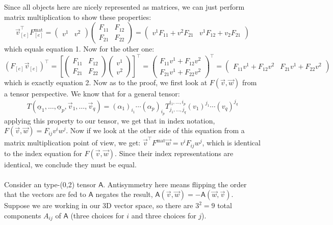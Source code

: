 \documentclass{article}
\begin{document}
\begin{solution}
	Since all objects here are nicely represented as matrices, we can just perform matrix multiplication to 
	show these properties:
	\[
		\vec v_{[e]}^\top F_{[e]}^\text{mat} = \begin{pmatrix} v^1 & v^2 \end{pmatrix} 
		\begin{pmatrix} F_{11} & F_{12}\\F_{21}& F_{22} \end{pmatrix} = \begin{pmatrix} v^1F_{11} + v^2F_{21} & 
	v^1F_{12} + v_2F_{21} \end{pmatrix}
	\]
	which equals equation 1. Now for the other one:
	\[
		(F_{[e]} \vec v_{[e]})^\top = \left[ \begin{pmatrix} F_{11} & F_{12} \\ F_{21} & F_{22} \end{pmatrix} \begin{pmatrix} v^1 \\ v^2 \end{pmatrix} \right]^\top = \begin{pmatrix} F_{11}v^1 + F_{12} v^2\\ F_{21} v^1 + F_{22} v^2 \end{pmatrix}^\top = \begin{pmatrix} F_{11} v^1 + F_{12}v^2 & F_{21} v^1 + F_{22} v^2 \end{pmatrix} 
	\] 
	which is exactly equation 2. Now as to the proof, we first look at $F(\vec v, \vec w)$ from a tensor
	perspective. We know that for a general tensor:
	\[
		T(\underline \alpha_1, \dots, \underline \alpha_p, \vec v_1, \dots, \vec v_q) = (\alpha_1)_{i_1} 
		\cdots (\alpha_p)_{i_p} T^{i_1, \dots, i_p}_{j_1, \dots, j_q} (v_1)^{j_1} \cdots (v_q)^{j_q}
	\] 
	applying this property to our tensor, we get that in index notation, $F(\vec v, \vec w) = F_{ij} v^i w^j$. 
	Now if we look at the other side of this equation from a matrix multiplication point of view, we get:
	$\vec v^\top F^{\text{mat}} \vec w = v^i F_{ij} w^j$, which is identical to the index equation for $F(\vec v,
	\vec w)$. Since their index representations are identical, we conclude they must be equal.
\end{solution}

\phline
\paragraph{}
Consider an  type-(0,2) tensor $\mathsf{A}$. 
 Antisymmetry here means flipping the order that the vectors are fed to $\mathsf{A}$ negates the result,
$\mathsf{A}(\vec{v},\vec{w}) = -\mathsf{A}(\vec{w},\vec{v})$.  Suppose we are working in our 3D vector space, so there are $3^{2}=9$ total components $A_{ij}$ of $\mathsf{A}$ 
(three choices for $i$ and three choices for $j$). 
\end{document}
